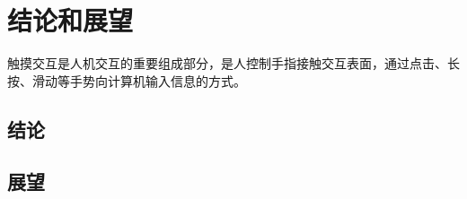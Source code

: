 \chapter{结论和展望}\label{section:conclusion}

触摸交互是人机交互的重要组成部分，是人控制手指接触交互表面，通过点击、长按、滑动等手势向计算机输入信息的方式。

\section{结论}

\section{展望}
